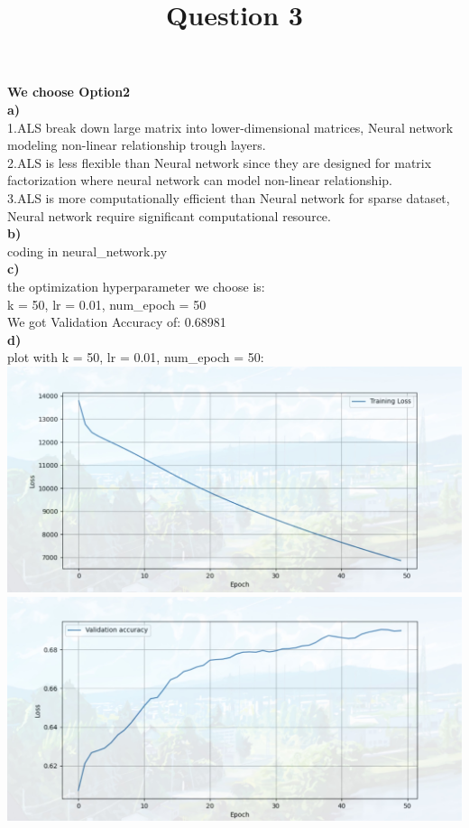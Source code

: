 \documentclass{article}
\title{Question 3}
\date{\vspace{-10.0ex}}
\begin{document}
\maketitle
\thispagestyle{fancy}

\begin{enumerate}
    \textbf{We choose Option2}\\
    \textbf{a)} \\
    1.ALS break down large matrix into lower-dimensional matrices, Neural network modeling non-linear relationship trough layers. \\
    2.ALS is less flexible than Neural network since they are designed for matrix factorization where neural network can model non-linear relationship.\\
    3.ALS is more computationally efficient than Neural network for sparse dataset, Neural network require significant computational resource. \\
    \textbf{b)}\\
    coding in neural\_network.py \\
    \textbf{c)}\\
    the optimization hyperparameter we choose is: \\
    k = 50, lr = 0.01, num\_epoch = 50 \\
    We got Validation Accuracy of: 0.68981 \\
    \textbf{d)}\\
    plot with k = 50, lr = 0.01, num\_epoch = 50: \\
    \includegraphics[width=0.7\linewidth]{6031723149317_.pic.jpg} \\
    \includegraphics[width=0.7\linewidth]{6041723149328_.pic.jpg} \\

\end{enumerate}
\end{document}
